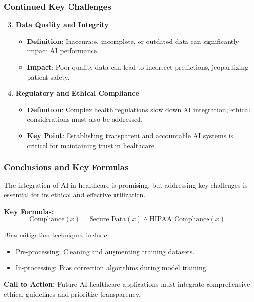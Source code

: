 \documentclass[aspectratio=169]{beamer}
\begin{document}
\begin{frame}[fragile]
    \frametitle{Continued Key Challenges}
    \begin{enumerate}
        \setcounter{enumi}{2} %
        \item \textbf{Data Quality and Integrity}
            \begin{itemize}
                \item \textbf{Definition}: Inaccurate, incomplete, or outdated data can significantly impact AI performance.
                \item \textbf{Impact}: Poor-quality data can lead to incorrect predictions, jeopardizing patient safety.
            \end{itemize}

        \item \textbf{Regulatory and Ethical Compliance}
            \begin{itemize}
                \item \textbf{Definition}: Complex health regulations slow down AI integration; ethical considerations must also be addressed.
                \item \textbf{Key Point}: Establishing transparent and accountable AI systems is critical for maintaining trust in healthcare.
            \end{itemize}
    \end{enumerate}
\end{frame}

\begin{frame}[fragile]
    \frametitle{Conclusions and Key Formulas}
    The integration of AI in healthcare is promising, but addressing key challenges is essential for its ethical and effective utilization. 

    \textbf{Key Formulas:}
    \begin{equation}
        \text{Compliance}(x) = \text{Secure Data}(x) \land \text{HIPAA Compliance}(x)
    \end{equation}

    Bias mitigation techniques include:
    \begin{itemize}
        \item Pre-processing: Cleaning and augmenting training datasets.
        \item In-processing: Bias correction algorithms during model training.
    \end{itemize}

    \textbf{Call to Action:} Future AI healthcare applications must integrate comprehensive ethical guidelines and prioritize transparency.
\end{frame}
\end{document}
